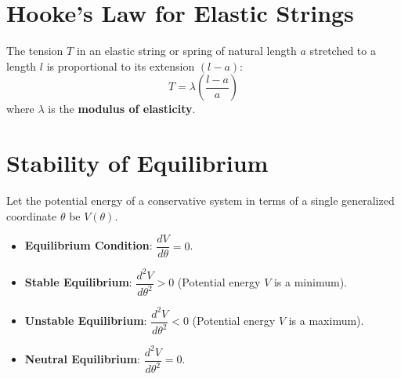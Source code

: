 \section{Hooke's Law for Elastic Strings}

\begin{defbox}
The tension $T$ in an elastic string or spring of natural length $a$ stretched to a length $l$ is proportional to its extension $(l - a)$:
\begin{equation}
    T = \lambda \left( \frac{l - a}{a} \right)
\end{equation}
where $\lambda$ is the \textbf{modulus of elasticity}.
\end{defbox}

\section{Stability of Equilibrium}

Let the potential energy of a conservative system in terms of a single generalized coordinate $\theta$ be $V(\theta)$.
\begin{itemize}
    \item \textbf{Equilibrium Condition}: $\dfrac{dV}{d\theta} = 0$.
    \item \textbf{Stable Equilibrium}: $\dfrac{d^2V}{d\theta^2} > 0$ (Potential energy $V$ is a minimum).
    \item \textbf{Unstable Equilibrium}: $\dfrac{d^2V}{d\theta^2} < 0$ (Potential energy $V$ is a maximum).
    \item \textbf{Neutral Equilibrium}: $\dfrac{d^2V}{d\theta^2} = 0$.
\end{itemize}

